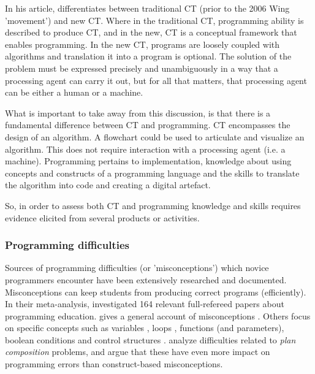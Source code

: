 In his article,  differentiates between traditional CT (prior to the 2006 Wing 'movement') and new CT. Where in the traditional CT, programming ability is described to produce CT, and in the new, CT is a conceptual framework that enables programming. In the new CT, programs are loosely coupled with algorithms and translation it into a program is optional. The solution of the problem must be expressed precisely and unambiguously in a way that a processing agent can carry it out, but for all that matters, that processing agent can be either a human or a machine\cite{corradini2017conceptions}.

What is important to take away from this discussion, is that there is a fundamental difference between CT and programming. CT encompasses the design of an algorithm. A flowchart could be used to articulate and visualize an algorithm. This does not require interaction with a processing agent (i.e. a machine). Programming pertains to implementation, knowledge about using concepts and constructs of a programming language and the skills to translate the algorithm into code and creating a digital artefact.

So, in order to assess both CT and programming knowledge and skills requires evidence elicited from several products or activities.

\subsubsection{Programming difficulties}


Sources of programming difficulties (or 'misconceptions') which novice programmers encounter have been extensively researched and documented. Misconceptions can keep students from producing correct programs (efficiently). In their meta-analysis,  investigated 164 relevant full-refereed papers about programming education. \citeauthor{robins2003learning} gives a general account of misconceptions \cite{robins2003learning}. Others focus on specific concepts such as variables \cite{Kuittinen2004}, loops \cite{Dancik2003}, functions (and parameters)\cite{sorva2012misconceptions}, boolean conditions and control structures \cite{Almstrum1999, Herman2010}.  analyze difficulties related to \emph{plan composition} problems, and argue that these have even more impact on programming errors than construct-based misconceptions.


